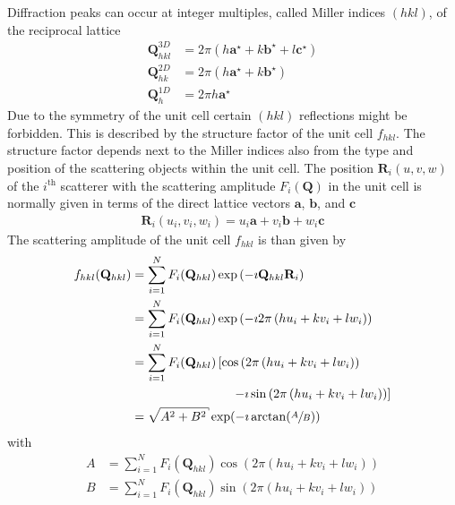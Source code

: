 Diffraction peaks can occur at integer multiples, called Miller indices $(hkl)$, of the reciprocal lattice
\begin{subequations}
\begin{align}
\mathbf{Q}_{hkl}^{3D} &= 2\pi\left( h\mathbf{a}^\star+k\mathbf{b}^\star+l\mathbf{c}^\star \right) \\
\mathbf{Q}_{hk}^{2D} &= 2\pi\left( h\mathbf{a}^\star+k\mathbf{b}^\star\right) \\
\mathbf{Q}_{h}^{1D} &= 2\pi h\mathbf{a}^\star
\end{align}
\end{subequations}
Due to the symmetry of the unit cell certain $(hkl)$ reflections might be forbidden. This is described by the structure factor of the unit cell $f_{hkl}$. The structure factor depends next to the Miller indices also from the type and position of the scattering objects within the unit cell. The position $\mathbf{R}_i(u,v,w)$ of the $i^\mathrm{th}$ scatterer with the scattering amplitude $F_i(\mathbf{Q})$ in the unit cell is normally given in terms of the direct lattice vectors $\mathbf{a}$, $\mathbf{b}$, and $\mathbf{c}$
\begin{align}
\mathbf{R}_i(u_i,v_i,w_i) = u_i \mathbf{a} + v_i\mathbf{b} +w_i\mathbf{c}
\end{align}
The scattering amplitude of the unit cell $f_{hkl}$ is than given by
\begin{subequations}
\begin{align}
f_{hkl} (\mathbf{Q}_{hkl}) &= \sum_{i=1}^N F_i(\mathbf{Q}_{hkl}) \exp\left( -\imath \mathbf{Q}_{hkl} \mathbf{R}_i\right) \\
                          &= \sum_{i=1}^N F_i(\mathbf{Q}_{hkl}) \exp\left( -\imath 2\pi \left(hu_i+kv_i+lw_i\right)\right) \\
&=  \sum_{i=1}^N F_i(\mathbf{Q}_{hkl}) \left[ \cos\left( 2\pi \left(hu_i+kv_i+lw_i\right)\right) \right. \nonumber \\
    & \qquad \qquad \qquad \qquad \left.- \imath \sin\left( 2\pi \left(hu_i+kv_i+lw_i\right)\right) \right] \\
    &= \sqrt{A^2+B^2} \exp(-\imath \arctan(\sfrac{A}{B}))
\end{align}
\end{subequations}
with
\begin{subequations}
\begin{align}
A &= \sum_{i=1}^N F_i(\mathbf{Q}_{hkl}) \cos\left( 2\pi \left(hu_i+kv_i+lw_i\right)\right) \\
B &= \sum_{i=1}^N F_i(\mathbf{Q}_{hkl}) \sin\left( 2\pi \left(hu_i+kv_i+lw_i\right)\right)
\end{align}
\end{subequations}

